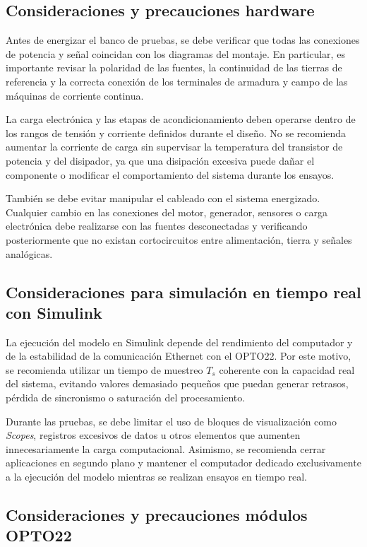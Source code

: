 
\subsection{Consideraciones y precauciones hardware}

Antes de energizar el banco de pruebas, se debe verificar que todas las conexiones de potencia y señal coincidan con los diagramas del montaje. En particular, es importante revisar la polaridad de las fuentes, la continuidad de las tierras de referencia y la correcta conexión de los terminales de armadura y campo de las máquinas de corriente continua.

La carga electrónica y las etapas de acondicionamiento deben operarse dentro de los rangos de tensión y corriente definidos durante el diseño. No se recomienda aumentar la corriente de carga sin supervisar la temperatura del transistor de potencia y del disipador, ya que una disipación excesiva puede dañar el componente o modificar el comportamiento del sistema durante los ensayos.

También se debe evitar manipular el cableado con el sistema energizado. Cualquier cambio en las conexiones del motor, generador, sensores o carga electrónica debe realizarse con las fuentes desconectadas y verificando posteriormente que no existan cortocircuitos entre alimentación, tierra y señales analógicas.

\subsection{Consideraciones para simulación en tiempo real con Simulink}
\label{subsec:simulink_consideraciones}

La ejecución del modelo en Simulink depende del rendimiento del computador y de la estabilidad de la comunicación Ethernet con el OPTO22. Por este motivo, se recomienda utilizar un tiempo de muestreo $T_s$ coherente con la capacidad real del sistema, evitando valores demasiado pequeños que puedan generar retrasos, pérdida de sincronismo o saturación del procesamiento.

Durante las pruebas, se debe limitar el uso de bloques de visualización como \emph{Scopes}, registros excesivos de datos u otros elementos que aumenten innecesariamente la carga computacional. Asimismo, se recomienda cerrar aplicaciones en segundo plano y mantener el computador dedicado exclusivamente a la ejecución del modelo mientras se realizan ensayos en tiempo real.

\subsection{Consideraciones y precauciones módulos OPTO22}
\label{subsec:opto22_consideraciones}

